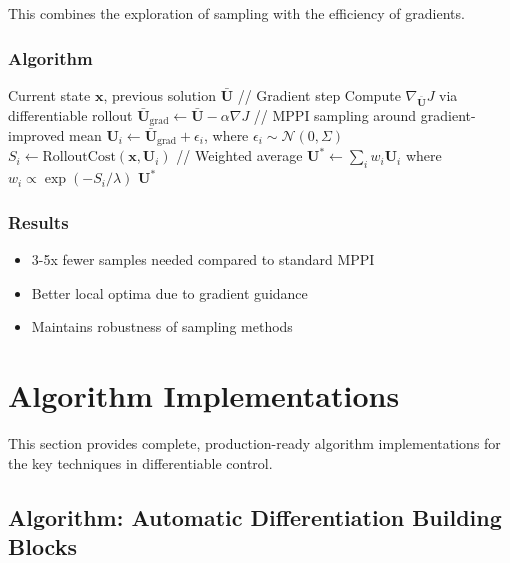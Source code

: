 This combines the exploration of sampling with the efficiency of gradients.

\subsubsection{Algorithm}

\begin{algorithm}[H]
\caption{Gradient-Enhanced MPPI}
\label{alg:grad_mppi}
\begin{algorithmic}[1]
\REQUIRE Current state $\mathbf{x}$, previous solution $\bar{\mathbf{U}}$
\STATE // Gradient step
\STATE Compute $\nabla_{\bar{\mathbf{U}}} J$ via differentiable rollout
\STATE $\bar{\mathbf{U}}_{\text{grad}} \gets \bar{\mathbf{U}} - \alpha \nabla J$
\STATE // MPPI sampling around gradient-improved mean
    \STATE $\mathbf{U}_i \gets \bar{\mathbf{U}}_{\text{grad}} + \epsilon_i$, where $\epsilon_i \sim \mathcal{N}(0, \Sigma)$
    \STATE $S_i \gets \text{RolloutCost}(\mathbf{x}, \mathbf{U}_i)$
\ENDFOR
\STATE // Weighted average
\STATE $\mathbf{U}^* \gets \sum_i w_i \mathbf{U}_i$ where $w_i \propto \exp(-S_i / \lambda)$
\RETURN $\mathbf{U}^*$
\end{algorithmic}
\end{algorithm}

\subsubsection{Results}

\begin{itemize}
    \item 3-5x fewer samples needed compared to standard MPPI
    \item Better local optima due to gradient guidance
    \item Maintains robustness of sampling methods
\end{itemize}

\section{Algorithm Implementations}
\label{sec:algorithms}

This section provides complete, production-ready algorithm implementations for the key techniques in differentiable control.

\subsection{Algorithm: Automatic Differentiation Building Blocks}

